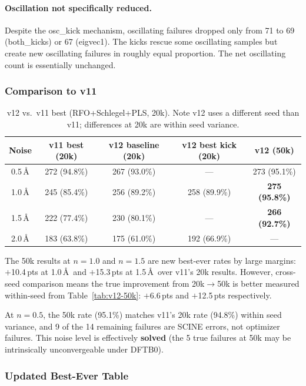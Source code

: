 \documentclass[11pt,a4paper]{article}
\theoremstyle{definition}
\begin{document}
\paragraph{Oscillation not specifically reduced.}
Despite the osc\_kick mechanism, oscillating failures dropped only
from 71 to 69 (both\_kicks) or 67 (eigvec1).  The kicks rescue some
oscillating samples but create new oscillating failures in roughly equal
proportion.  The net oscillating count is essentially unchanged.

\subsubsection{Comparison to v11}
\label{sec:v12-vs-v11}

\begin{table}[h]
\centering
\caption{v12 vs.\ v11 best (RFO+Schlegel+PLS, 20k).  Note v12 uses a
  different seed than v11; differences at 20k are within seed variance.}
\label{tab:v12-vs-v11}
\begin{tabular}{ccccc}
\toprule
Noise & v11 best (20k) & v12 baseline (20k) & v12 best kick (20k) & v12 (50k) \\
\midrule
0.5\,\AA & 272 (94.8\%) & 267 (93.0\%) & --- & 273 (95.1\%) \\
1.0\,\AA & 245 (85.4\%) & 256 (89.2\%) & 258 (89.9\%) & \textbf{275 (95.8\%)} \\
1.5\,\AA & 222 (77.4\%) & 230 (80.1\%) & --- & \textbf{266 (92.7\%)} \\
2.0\,\AA & 183 (63.8\%) & 175 (61.0\%) & 192 (66.9\%) & --- \\
\bottomrule
\end{tabular}
\end{table}

The 50k results at $n=1.0$ and $n=1.5$ are new best-ever rates by large
margins: $+$10.4\,pts at 1.0\,\AA\ and $+$15.3\,pts at 1.5\,\AA\ over
v11's 20k results.  However, cross-seed comparison means the true
improvement from 20k$\to$50k is better measured within-seed from
Table~\ref{tab:v12-50k}: $+$6.6\,pts and $+$12.5\,pts respectively.

At $n=0.5$, the 50k rate (95.1\%) matches v11's 20k rate (94.8\%) within
seed variance, and 9 of the 14 remaining failures are SCINE errors, not
optimizer failures.  This noise level is effectively \textbf{solved}
(the 5 true failures at 50k may be intrinsically unconvergeable under
DFTB0).

\subsubsection{Updated Best-Ever Table}
\label{sec:v12-best-ever}
\end{document}
